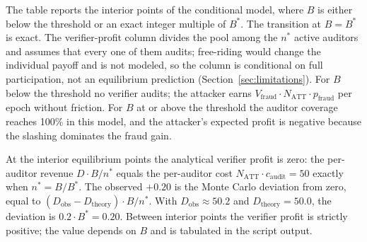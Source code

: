 \documentclass[11pt,a4paper]{article}
\numberwithin{equation}{section}
\numberwithin{table}{section}
\begin{document}
\begin{table}[H]
\centering
\caption{Audit comparative statics at exogenous $p_{\mathrm{fraud}} = 0.10$: auditors, detection, attacker and verifier profit, integrity. Verifier profit is per active auditor under equal division and full participation; free-riding and the endogeneity of $p_{\mathrm{fraud}}$ are not represented (Section~\ref{sec:limitations}).}
\label{tab:equilibrium}
\end{table}

The table reports the interior points of the conditional model, where $B$ is either below the threshold or an exact integer multiple of $B^*$. The transition at $B = B^*$ is exact. The verifier-profit column divides the pool among the $n^*$ active auditors and assumes that every one of them audits; free-riding would change the individual payoff and is not modeled, so the column is conditional on full participation, not an equilibrium prediction (Section~\ref{sec:limitations}). For $B$ below the threshold no verifier audits; the attacker earns $V_{\mathrm{fraud}} \cdot N_{\mathrm{ATT}} \cdot p_{\mathrm{fraud}}$ per epoch without friction. For $B$ at or above the threshold the auditor coverage reaches 100\% in this model, and the attacker's expected profit is negative because the slashing dominates the fraud gain.

At the interior equilibrium points the analytical verifier profit is zero: the per-auditor revenue $D \cdot B / n^*$ equals the per-auditor cost $N_{\mathrm{ATT}} \cdot c_{\mathrm{audit}} = 50$ exactly when $n^* = B/B^*$. The observed $+0.20$ is the Monte Carlo deviation from zero, equal to $(D_{\text{obs}} - D_{\text{theory}}) \cdot B / n^*$. With $D_{\text{obs}} \approx 50.2$ and $D_{\text{theory}} = 50.0$, the deviation is $0.2 \cdot B^* = 0.20$. Between interior points the verifier profit is strictly positive; the value depends on $B$ and is tabulated in the script output.
\end{document}
